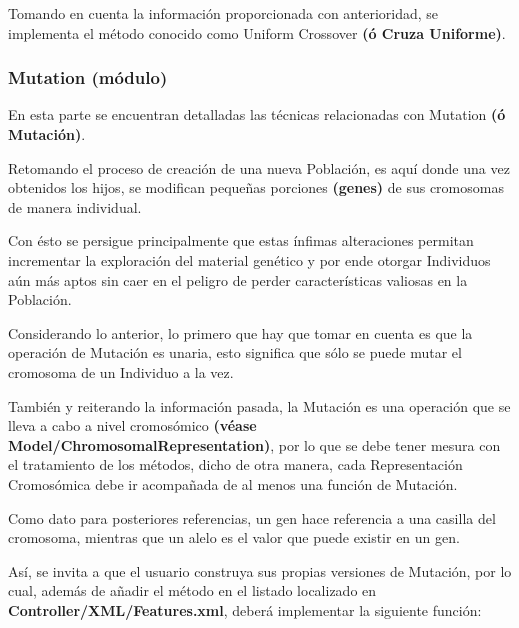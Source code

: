 \documentclass[letterpaper,10pt,english]{sphinxmanual}
\begin{document}
\label{Model/Operator/Crossover/UniformCrossover:module-Model.Operator.Crossover.UniformCrossover}

\begin{fulllineitems}
\label{Model/Operator/Crossover/UniformCrossover:Model.Operator.Crossover.UniformCrossover.execute_crossover_technique}
Tomando en cuenta la información proporcionada con anterioridad, 
se implementa el método conocido como Uniform Crossover \textbf{(ó Cruza Uniforme)}.

\end{fulllineitems}



\subsubsection{Mutation (módulo)}
\label{Model/Operator/Mutation/Mutation:mutation-modulo}\label{Model/Operator/Mutation/Mutation::doc}
\begin{DUlineblock}{0em}
\item[] En esta parte se encuentran detalladas las técnicas relacionadas con
Mutation \textbf{(ó Mutación)}.
\item[] Retomando el proceso de creación de una nueva Población, es aquí donde
una vez obtenidos los hijos, se modifican pequeñas porciones \textbf{(genes)} de sus cromosomas
de manera individual.
\item[] Con ésto se persigue principalmente que estas ínfimas alteraciones permitan
incrementar la exploración del material genético y por ende otorgar Individuos
aún más aptos sin caer en el peligro de perder características valiosas en la
Población.
\item[] 
\item[] Considerando lo anterior, lo primero que hay que tomar en cuenta es que
la operación de Mutación es unaria, esto significa que sólo se puede mutar
el cromosoma de un Individuo a la vez.
\item[] También y reiterando la información pasada, la Mutación es una operación
que se lleva a cabo a nivel cromosómico \textbf{(véase Model/ChromosomalRepresentation)},
por lo que se debe tener mesura  con el tratamiento de los métodos, dicho de otra manera,
cada Representación Cromosómica debe ir acompañada de al menos una función de Mutación.
\item[] 
\item[] Como dato para posteriores referencias, un gen hace referencia a una casilla del cromosoma,
mientras que un alelo es el valor que puede existir en un gen.
\item[] 
\item[] Así, se invita a que el usuario construya sus propias versiones
de Mutación, por lo cual, además de añadir el método en el listado localizado en
\textbf{Controller/XML/Features.xml}, deberá implementar la siguiente función:
\end{DUlineblock}
\end{document}
